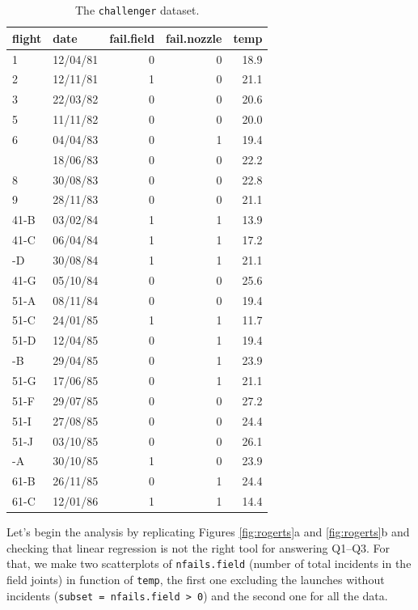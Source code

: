 \documentclass[]{book}
\theoremstyle{definition}
\theoremstyle{definition}
\theoremstyle{definition}
\theoremstyle{remark}
\begin{document}
\begin{longtable}[t]{llrrr}
\caption{\label{tab:unnamed-chunk-61}The \texttt{challenger} dataset.}\\
\toprule
flight & date & fail.field & fail.nozzle & temp\\
\midrule
1 & 12/04/81 & 0 & 0 & 18.9\\
2 & 12/11/81 & 1 & 0 & 21.1\\
3 & 22/03/82 & 0 & 0 & 20.6\\
5 & 11/11/82 & 0 & 0 & 20.0\\
6 & 04/04/83 & 0 & 1 & 19.4\\
\addlinespace
7 & 18/06/83 & 0 & 0 & 22.2\\
8 & 30/08/83 & 0 & 0 & 22.8\\
9 & 28/11/83 & 0 & 0 & 21.1\\
41-B & 03/02/84 & 1 & 1 & 13.9\\
41-C & 06/04/84 & 1 & 1 & 17.2\\
\addlinespace
41-D & 30/08/84 & 1 & 1 & 21.1\\
41-G & 05/10/84 & 0 & 0 & 25.6\\
51-A & 08/11/84 & 0 & 0 & 19.4\\
51-C & 24/01/85 & 1 & 1 & 11.7\\
51-D & 12/04/85 & 0 & 1 & 19.4\\
\addlinespace
51-B & 29/04/85 & 0 & 1 & 23.9\\
51-G & 17/06/85 & 0 & 1 & 21.1\\
51-F & 29/07/85 & 0 & 0 & 27.2\\
51-I & 27/08/85 & 0 & 0 & 24.4\\
51-J & 03/10/85 & 0 & 0 & 26.1\\
\addlinespace
61-A & 30/10/85 & 1 & 0 & 23.9\\
61-B & 26/11/85 & 0 & 1 & 24.4\\
61-C & 12/01/86 & 1 & 1 & 14.4\\
\bottomrule
\end{longtable}

Let's begin the analysis by replicating Figures \ref{fig:rogerts}a and
\ref{fig:rogerts}b and checking that linear regression is not the right
tool for answering Q1--Q3. For that, we make two scatterplots of
\texttt{nfails.field} (number of total incidents in the field joints) in
function of \texttt{temp}, the first one excluding the launches without
incidents (\texttt{subset\ =\ nfails.field\ \textgreater{}\ 0}) and the
second one for all the data.
\end{document}
